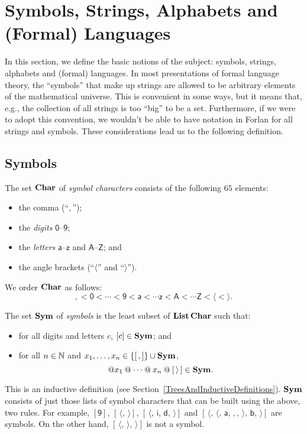 \section{Symbols, Strings, Alphabets and (Formal) Languages}
\label{SymbolsStringsAlphabetsAndFormalLanguages}

In this section, we define the basic notions of the subject: symbols,
strings, alphabets and (formal) languages.
In most presentations of formal language theory, the ``symbols'' that
make up strings are allowed to be arbitrary elements of the
mathematical universe.  This is convenient in some ways, but it means
that, e.g., the collection of all strings is too ``big'' to be a set.
Furthermore, if we were to adopt this convention, we wouldn't be
able to have notation in Forlan for all strings and symbols.  These
considerations lead us to the following definition.

\subsection{Symbols}

%
The set $\mathbf{Char}$ of \emph{symbol characters} consists of the
following $65$ elements:
\begin{itemize}
\item the comma (``$,$'');

\item the \emph{digits} $\mathsf{0}$--$\mathsf{9}$;

\item the \emph{letters} $\mathsf{a}$--$\mathsf{z}$ and
  $\mathsf{A}$--$\mathsf{Z}$; and

\item the angle brackets (``$\langle$'' and ``$\rangle$'').
\end{itemize}
We order $\mathbf{Char}$ as follows:
\begin{displaymath}
  {,} <
  \mathsf{0} < \cdots < \mathsf{9} <
  \mathsf{a} < \cdots \mathsf{z} < 
  \mathsf{A} < \cdots \mathsf{Z} <
  {\langle} < {\rangle} .
\end{displaymath}

The set $\mathbf{Sym}$ of \emph{symbols} is the least subset of
%
%
$\mathbf{List}\,\mathbf{Char}$ such that:
\begin{itemize}
\item for all digits and letters $c$, $[c]\in\mathbf{Sym}$; and

\item for all $n\in\mathbb{N}$ and $x_1,\ldots,x_n\in\{[\,,]\}\cup\mathbf{Sym}$,
  \begin{displaymath}
    [\,\langle\,] \myconcat x_1 \myconcat \cdots \myconcat x_n \myconcat
    [\,\rangle\,]\in\Sym . 
  \end{displaymath}
\end{itemize}
This is an inductive definition (see
Section~\ref{TreesAndInductiveDefinitions}).  $\mathbf{Sym}$ consists of just
those lists of symbol characters that can be built using the above,
two rules.  For example, $[\mathsf{9}]$, $[\,\langle,\,\rangle]$,
$\mathsf{[\,\langle, \,i, \,d, \,\rangle]}$ and
$\mathsf{[\,\langle, \,\langle, \,a, \,,, \,\rangle, \,b, \,\rangle]}$
are symbols.  On the other hand, $[\,\langle,\,\rangle,\,\rangle]$ is
not a symbol.

